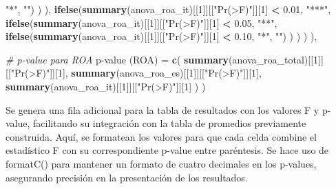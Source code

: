\documentclass[
]{article}
\newenvironment{Shaded}{\begin{snugshade}}{\end{snugshade}}
\newcommand{\AttributeTok}[1]{\textcolor[rgb]{0.13,0.29,0.53}{#1}}
\newcommand{\CommentTok}[1]{\textcolor[rgb]{0.56,0.35,0.01}{\textit{#1}}}
\newcommand{\DecValTok}[1]{\textcolor[rgb]{0.00,0.00,0.81}{#1}}
\newcommand{\FloatTok}[1]{\textcolor[rgb]{0.00,0.00,0.81}{#1}}
\newcommand{\FunctionTok}[1]{\textcolor[rgb]{0.13,0.29,0.53}{\textbf{#1}}}
\newcommand{\NormalTok}[1]{#1}
\newcommand{\OtherTok}[1]{\textcolor[rgb]{0.56,0.35,0.01}{#1}}
\newcommand{\SpecialCharTok}[1]{\textcolor[rgb]{0.81,0.36,0.00}{\textbf{#1}}}
\newcommand{\StringTok}[1]{\textcolor[rgb]{0.31,0.60,0.02}{#1}}
\begin{document}
\begin{Shaded}
\begin{Highlighting}[]
                           \StringTok{"*"}\NormalTok{, }\StringTok{""}\NormalTok{)}
\NormalTok{             )}
\NormalTok{      ),}
      \FunctionTok{ifelse}\NormalTok{(}\FunctionTok{summary}\NormalTok{(anova\_roa\_it)[[}\DecValTok{1}\NormalTok{]][[}\StringTok{"Pr(\textgreater{}F)"}\NormalTok{]][}\DecValTok{1}\NormalTok{] }\SpecialCharTok{\textless{}} \FloatTok{0.01}\NormalTok{, }\StringTok{"***"}\NormalTok{,}
             \FunctionTok{ifelse}\NormalTok{(}\FunctionTok{summary}\NormalTok{(anova\_roa\_it)[[}\DecValTok{1}\NormalTok{]][[}\StringTok{"Pr(\textgreater{}F)"}\NormalTok{]][}\DecValTok{1}\NormalTok{] }\SpecialCharTok{\textless{}} \FloatTok{0.05}\NormalTok{, }\StringTok{"**"}\NormalTok{,}
                    \FunctionTok{ifelse}\NormalTok{(}\FunctionTok{summary}\NormalTok{(anova\_roa\_it)[[}\DecValTok{1}\NormalTok{]][[}\StringTok{"Pr(\textgreater{}F)"}\NormalTok{]][}\DecValTok{1}\NormalTok{] }\SpecialCharTok{\textless{}} \FloatTok{0.10}\NormalTok{,}
                           \StringTok{"*"}\NormalTok{, }\StringTok{""}\NormalTok{)}
\NormalTok{             )}
\NormalTok{      )}
\NormalTok{    )}
\NormalTok{  ),}
  
  \CommentTok{\# p{-}value para ROA}
  \StringTok{\textasciigrave{}}\AttributeTok{p{-}value (ROA)}\StringTok{\textasciigrave{}} \OtherTok{=} \FunctionTok{c}\NormalTok{(}
    \FunctionTok{summary}\NormalTok{(anova\_roa\_total)[[}\DecValTok{1}\NormalTok{]][[}\StringTok{"Pr(\textgreater{}F)"}\NormalTok{]][}\DecValTok{1}\NormalTok{],}
    \FunctionTok{summary}\NormalTok{(anova\_roa\_es)[[}\DecValTok{1}\NormalTok{]][[}\StringTok{"Pr(\textgreater{}F)"}\NormalTok{]][}\DecValTok{1}\NormalTok{],}
    \FunctionTok{summary}\NormalTok{(anova\_roa\_it)[[}\DecValTok{1}\NormalTok{]][[}\StringTok{"Pr(\textgreater{}F)"}\NormalTok{]][}\DecValTok{1}\NormalTok{]}
\NormalTok{  )}
\NormalTok{)}
\end{Highlighting}
\end{Shaded}

Se genera una fila adicional para la tabla de resultados con los valores
F y p-value, facilitando su integración con la tabla de promedios
previamente construida. Aquí, se formatean los valores para que cada
celda combine el estadístico F con su correspondiente p-value entre
paréntesis. Se hace uso de formatC() para mantener un formato de cuatro
decimales en los p-values, asegurando precisión en la presentación de
los resultados.
\end{document}

